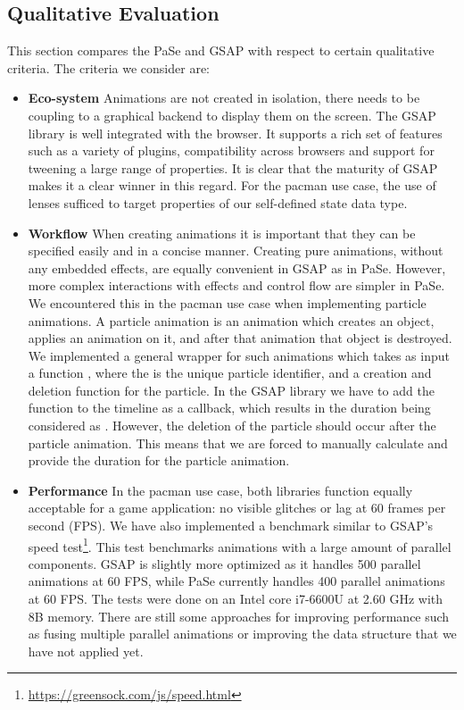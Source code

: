 \subsection{Qualitative Evaluation}

This section compares the PaSe and GSAP with respect to certain qualitative criteria. The criteria we consider are:

\begin{itemize}
\item \textbf{Eco-system} Animations are not created in isolation, there needs to be coupling to a graphical backend to display them on the screen. The GSAP library is well integrated with the browser. It supports a rich set of features such as a variety of plugins, compatibility across browsers and support for tweening a large range of properties. It is clear that the maturity of GSAP makes it a clear winner in this regard. For the pacman use case, the use of lenses sufficed to target properties of our self-defined state data type.
\item \textbf{Workflow} When creating animations it is important that they can be specified easily and in a concise manner. Creating pure animations, without any embedded effects, are equally convenient in GSAP as in PaSe. However, more complex interactions with effects and control flow are simpler in PaSe. We encountered this in the pacman use case when implementing particle animations. A particle animation is an animation which creates an object, applies an animation on it, and after that animation that object is destroyed. We implemented a general wrapper for such animations which takes as input a function , where the  is the unique particle identifier, and a creation and deletion function for the particle. In the GSAP library we have to add the function to the timeline as a callback, which results in the duration being considered as . However, the deletion of the particle should occur after the particle animation. This means that we are forced to manually calculate and provide the duration for the particle animation.
\item \textbf{Performance} In the pacman use case, both libraries function equally acceptable for a game application: no visible glitches or lag at 60 frames per second (FPS). We have also implemented a benchmark similar to GSAP's speed test\footnote{\url{https://greensock.com/js/speed.html}}. This test benchmarks animations with a large amount of parallel components. GSAP is slightly more optimized as it handles 500 parallel animations at 60 FPS, while PaSe currently handles 400 parallel animations at 60 FPS. The tests were done on an Intel core i7-6600U at 2.60 GHz with 8B memory. There are still some approaches for improving performance such as fusing multiple parallel animations or improving the  data structure that we have not applied yet.

\end{itemize}
